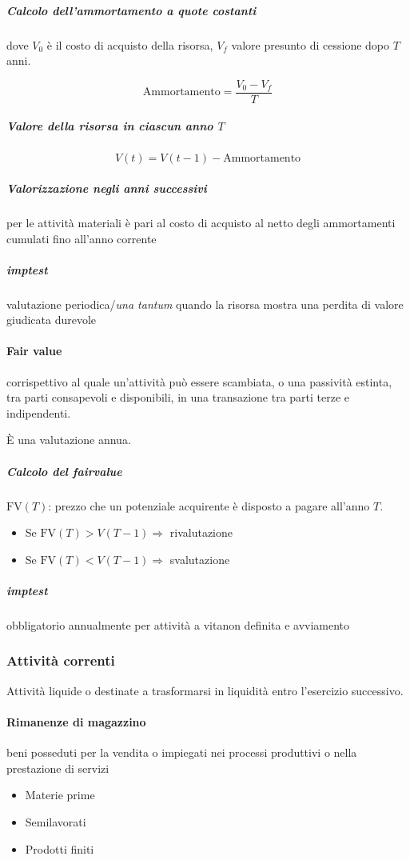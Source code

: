 \subparagraph{Calcolo dell'ammortamento a quote costanti} dove $V_0$ è il costo
di acquisto della risorsa, $V_f$ valore presunto di cessione dopo $T$ anni.

\begin{equation*}
    \text{Ammortamento} = \frac{V_0 - V_f}{T}
\end{equation*}

\subparagraph{Valore della risorsa in ciascun anno $T$}
\begin{equation*}
    V(t) = V(t-1) - \text{Ammortamento}
\end{equation*}

\subparagraph{Valorizzazione negli anni successivi} per le attività materiali è pari al
costo di acquisto al netto degli ammortamenti cumulati fino all’anno corrente

\subparagraph{\Gls{imptest}} valutazione periodica/\emph{una tantum} quando la
risorsa mostra una perdita di valore giudicata durevole

\paragraph{Fair value} corrispettivo al quale un'attività può essere scambiata,
o una passività estinta, tra parti consapevoli e disponibili, in una transazione
tra parti terze e indipendenti.

È una valutazione annua.

\subparagraph{Calcolo del \gls{fairvalue}}
$\text{FV}(T)$: prezzo che un potenziale acquirente è disposto a pagare all'anno $T$.
\begin{itemize}
    \item Se $\text{FV}(T) > V(T-1) \Rightarrow$ rivalutazione
    \item Se $\text{FV}(T) < V(T-1) \Rightarrow$ svalutazione
\end{itemize}

\subparagraph{\Gls{imptest}} obbligatorio annualmente per attività a vitanon definita e avviamento

\subsubsection{Attività correnti}
Attività liquide o destinate a trasformarsi in liquidità entro l’esercizio successivo.

\paragraph{Rimanenze di magazzino} beni posseduti per la vendita o impiegati nei
processi produttivi o nella prestazione di servizi
\begin{itemize}
    \item Materie prime
    \item Semilavorati
    \item Prodotti finiti
\end{itemize}

